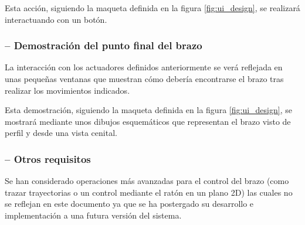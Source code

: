 Esta acción, siguiendo la maqueta definida en la figura \ref{fig:ui_design}, se realizará interactuando con
un botón.

\subsubsection*{ -- Demostración del punto final del brazo}
La interacción con los actuadores definidos anteriormente se verá reflejada en unas pequeñas ventanas
que muestran cómo debería encontrarse el brazo tras realizar los movimientos indicados.

Esta demostración, siguiendo la maqueta definida en la figura \ref{fig:ui_design}, se mostrará mediante
unos dibujos esquemáticos que representan el brazo visto de perfil y desde una vista cenital.

\subsubsection*{ -- Otros requisitos}
Se han considerado operaciones más avanzadas para el control del brazo (como trazar trayectorias o
un control mediante el ratón en un plano 2D) las cuales no se reflejan en este documento ya que se
ha postergado su desarrollo e implementación a una futura versión del sistema.
